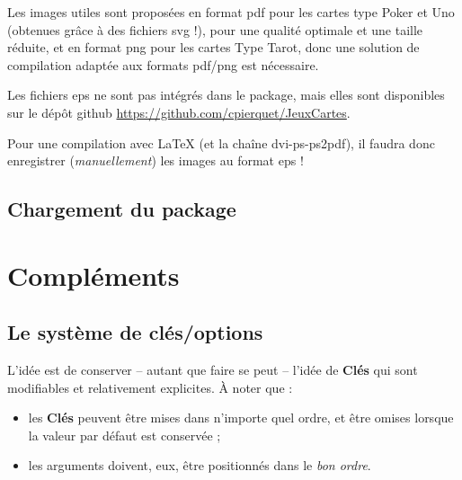 \documentclass{article}
\newcommand\Cle[1]{{\bfseries\sffamily\textlangle #1\textrangle}}
\begin{document}
{{{{{{{{{\begin{codeattention}
Les images utiles sont proposées en format \textsf{pdf} pour les cartes type \textsf{Poker} et \textsf{Uno} (obtenues grâce à des fichiers \textsf{svg} !), pour une qualité optimale et une taille réduite, et en format \textsf{png} pour les cartes Type \textsf{Tarot}, donc une solution de compilation adaptée aux formats \textsf{pdf/png} est nécessaire.

\smallskip

Les fichiers \textsf{eps} ne sont pas intégrés dans le package, mais elles sont disponibles sur le dépôt \textsf{github} \url{https://github.com/cpierquet/JeuxCartes}.

\smallskip

Pour une compilation avec \LaTeX{} (et la chaîne \textsf{dvi-ps-ps2pdf}), il faudra donc enregistrer (\textit{manuellement}) les images au format \textsf{eps} !
\end{codeattention}

\subsection{Chargement du package}



\section{Compléments}

\subsection{Le système de \og clés/options \fg}

\begin{codeidee}
L'idée est de conserver -- autant que faire se peut -- l'idée de \Cle{Clés} qui sont modifiables et relativement explicites. À noter que :
%
\begin{itemize}[leftmargin=*]
	\item les \Cle{Clés} peuvent être mises dans n'importe quel ordre, et être omises lorsque la valeur par défaut est conservée ;
	\item les \textsf{arguments} doivent, eux, être positionnés dans le \textit{bon ordre}.
\end{itemize}
\end{codeidee}

}}}}}}}}}
\end{document}

